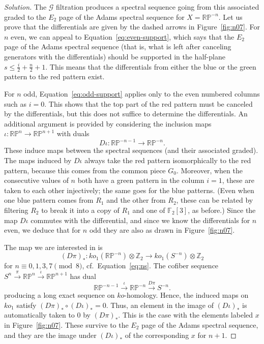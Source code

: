 \documentclass{amsart}
\def\RP{\mathbb{RP}}
\def\Gilt{\mathcal{G}}
\newcommand{\from}{\colon}
\newcommand{\FF}{\mathbb{F}}
\newcommand{\ZZ}{\mathbb{Z}}
\begin{document}
\begin{proof}[Solution]
The $\Gilt$ filtration produces a spectral sequence going from this
associated graded to the $E_2$ page of the Adams spectral sequence for
$X=\RP^{-n}$. Let us prove that the differentials are given by the
dashed arrows in Figure~\ref{fig:n07}. For $n$ even, we can appeal to
Equation~\eqref{eq:even-support}, which says that the $E_2$ page of
the Adams spectral sequence (that is, what is left after canceling
generators with the differentials) should be supported in the
half-plane $s \leq \frac{i}{2} + \frac{n}{2}+1.$ This means that the
differentials from either the blue or the green pattern to the red
pattern exist.

For $n$ odd, Equation~\eqref{eq:odd-support} applies only to the even numbered columns such as $i=0$. This
shows that the top part of the red pattern must be canceled by the
differentials, but this does not suffice to determine the
differentials. An additional argument is provided by considering the
inclusion maps $\iota: \RP^{n} \to \RP^{n+1}$
with duals
\[
  D\iota\from \RP^{-n-1} \to \RP^{-n}.
\]
These induce maps between the spectral sequences (and their associated
graded). The maps induced by $D\iota$ always take the red pattern
isomorphically to the red pattern, because this comes from the common
piece $G_0$. Moreover, when the consecutive values of $n$ both have a
green pattern in the column $i=1$, these are taken to each other
injectively; the same goes for the blue patterns. (Even when one blue
pattern comes from $R_1$ and the other from $R_2$, these can be
related by filtering $R_2$ to break it into a copy of $R_1$ and one of
$\FF_2[3]$, as before.)  Since the map $D\iota$ commutes with the
differential, and since we know the differentials for $n$ even, we
deduce that for $n$ odd they are also as drawn in
Figure~\ref{fig:n07}.


The map we are interested in is 
\[
  (D\pi)_*\from ko_1(\RP^{-n}) \otimes \ZZ_2 \to ko_1(S^{-n}) \otimes \ZZ_2
\]
for $n\equiv 0,1,3,7\!\!\pmod 8$, cf.~Equation~\eqref{eq:ns}.  The
cofiber sequence
$S^n \xrightarrow{\pi} \RP^{n} \xrightarrow{\iota} \RP^{n+1} $ has
dual
\[
  \RP^{-n-1} \xrightarrow{\iota}  \RP^{-n} \xrightarrow{D\pi} S^{-n}.
\]
producing a long exact sequence on $ko$-homology. Hence, the induced
maps on $ko_1$ satisfy $(D\pi)_* \circ (D\iota)_* = 0.$ Thus, an
element in the image of $(D\iota)_*$ is automatically taken to $0$ by
$(D\pi)_*$. This is the case with the elements labeled $x$ in
Figure~\ref{fig:n07}. These survive to the $E_2$ page of the Adams
spectral sequence, and they are the image under $(D\iota)_*$ of the
corresponding $x$ for $n+1$.


\end{proof}
\end{document}
